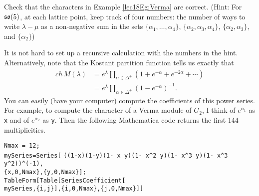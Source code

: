  \begin{exercise}
   Check that the characters in Example \ref{lec18Eg:Verma} are correct. (Hint: For
   $\mathfrak{so}(5)$, at each lattice point, keep track of four numbers: the number of ways to
   write $\lambda-\mu$ as a non-negative sum in the sets $\{\alpha_1,\dots,
   \alpha_4\}$, $\{\alpha_2,\alpha_3,\alpha_4\}$, $\{\alpha_2,\alpha_3\}$, and
   $\{\alpha_2\}$)
   \begin{solution}
     It is not hard to set up a recursive calculation with the numbers in the hint.
     Alternatively, note that the Kostant partition function tells us exactly that
     \begin{align*}
        ch\, M(\lambda) &= e^\lambda\prod_{\alpha\in \Delta^+}(1+e^{-\alpha} +
        e^{-2\alpha}+\cdots)\\
        &= e^\lambda \prod_{\alpha\in\Delta^+}(1-e^{-\alpha})^{-1}.
     \end{align*}
     You can easily (have your computer) compute the coefficients of this power
     series. For example, to compute the character of a Verma module of $G_2$, I think
     of $e^{\alpha_1}$ as \verb!x! and of $e^{\alpha_2}$ as \verb!y!. Then the following
     Mathematica code returns the first 144 multiplicities.\\
     {\raggedright
      \verb!Nmax = 12;! \\
      \verb!mySeries=Series[!
      \hspace*{1em} \verb!((1-x)(1-y)(1- x y)(1- x^2 y)(1- x^3 y)(1- x^3 y^2))^(-1),! \\
      \qquad \verb!{x,0,Nmax},{y,0,Nmax}];! \\
      \verb!TableForm[Table[SeriesCoefficient[! \\
      \hspace{10em}\verb!mySeries,{i,j}],{i,0,Nmax},{j,0,Nmax}]]!
     }
   \end{solution}
 \end{exercise}

